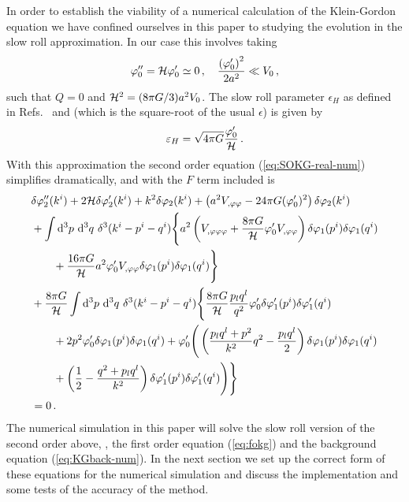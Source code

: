 In order to establish the viability of a numerical calculation of the
Klein-Gordon equation we have confined ourselves in this paper to studying the
evolution in the slow roll approximation. In our case this involves taking
%
\begin{equation}
 \varphi_{0}'' = \mathcal{H} \varphi_{0}' \simeq 0\,,\quad
\frac{\left(\varphi_{0}'\right)^2}{2a^2}\ll V_{0}\,,
\end{equation}
%
such that $Q=0$ and $\mathcal{H}^2 = (8\pi G/3) a^2 V_{0}$. The slow roll parameter
$\epsilon_H$ as defined in Refs.~\cite{Malik:2006ir} and \cite{Seery:2005gb} 
(which is the square-root of the usual $\epsilon$) is given by
%
\begin{equation}
 \varepsilon_H = \sqrt{4\pi G} \frac{\varphi_{0}'}{\mathcal{H}}\,.
\end{equation}
%
With this approximation the second order equation (\ref{eq:SOKG-real-num})
simplifies dramatically, and with the $F$ term included is
%
\begin{align}
 \label{eq:KG2-fourier-sr-num}
&\dvp2''(\kvi)+2\H\dvp2'(\kvi)+k^2\dvp2(\kvi)
+\left(a^2
\Upp-{24 \pi G}(\vp_{0}')^2\right)
\dvp2(\kvi) \nonumber\\
%
&+ \int \d^3p\ \d^3q\ \delta^3(\kvi-\pvi-\qvi) \Bigg\{
a^2\left(\Uppp
+ \frac{8\pi G}{\H}\vp_{0}' \Upp\right)
 \dvp1(\pvi)\dvp1(\qvi) \nonumber \\
%
&\qquad +\frac{16\pi G}{\H}a^2
\vp_{0}'\Upp\dvp1(\pvi)\dvp1(\qvi)\Bigg\}
\nonumber \\
%
&+ \frac{8\pi G}{\H}
\int \d^3p\ \d^3q\ \delta^3(\kvi-\pvi-\qvi)  \Bigg\{
%
\frac{8\pi G}{\H}\frac{p_l q^l}{q^2}\vp_{0}'\dvp1'(\pvi)
\dvp1'(\qvi) \nonumber\\
% 
&\qquad+ 2p^2\vp_{0}' \dvp1(\pvi) \dvp1(\qvi)
%
+\vp_{0}'
\Bigg(
\left(\frac{p_lq^l+p^2}{k^2}q^2-\frac{p_lq^l}{2}\right)
\dvp1(\pvi)\dvp1(\qvi) \nonumber \\
% 
&\qquad+\left(\frac{1}{2}-\frac{q^2+p_lq^l}{k^2}\right)
\dvp1'(\pvi)\dvp1'(\qvi)\Bigg)
\Bigg\} \nonumber \\
% 
&=0 \,.
\end{align}
%
The numerical simulation in this paper will solve the slow roll
version of the second order above, , the first
order equation (\ref{eq:fokg}) and the background equation
(\ref{eq:KGback-num}). In the next section we set up the correct form of
these equations for the numerical simulation and discuss the
implementation and some tests of the accuracy of the method.
% 
% 
% 
% 
